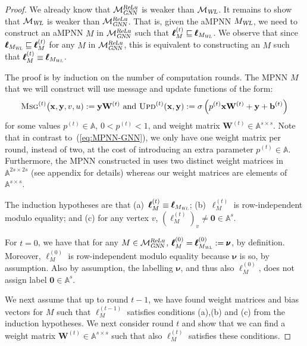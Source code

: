 \begin{proof}
We already know that $\mathcal{M}_{\textsl{GNN}}^{\textsl{ReLu}}$ is weaker than $\mathcal{M}_{\textsl{WL}}$. It remains to show that $\mathcal{M}_{\textsl{WL}}$ is weaker than $\mathcal{M}_{\textsl{GNN}}^{\textsl{ReLu}}$. That is, given the aMPNN $M_{\textsl{WL}}$, we need to construct an aMPNN $M$ in $\mathcal{M}_{\textsl{GNN}}^{\textsl{ReLu}}$ such that 
$\pmb{\ell}_{M}^{(t)}\sqsubseteq \pmb{\ell}_{M_{\textsl{WL}}}$. We observe that
since $\pmb{\ell}_{M_{\textsl{WL}}}\sqsubseteq \pmb{\ell}_{M}^{(t)}$ for any $M$ in $\mathcal{M}_{\textsl{GNN}}^{\textsl{ReLu}}$, this is equivalent to constructing an $M$ such that $\pmb{\ell}_{M}^{(t)}\equiv \pmb{\ell}_{M_{\textsl{WL}}}$. 

The proof is by induction on the number of computation rounds. The MPNN $M$ that we will construct will use message and update functions of the form:
\begin{equation}\textsc{Msg}^{(t)}\bigl(\mathbf{x},\mathbf{y},v,u):=\mathbf{y}\mathbf{W}^{(t)}
\text{ and } 
\textsc{Upd}^{(t)}(\mathbf{x},\mathbf{y}):=\sigma\left(p^{(t)}\mathbf{x}\mathbf{W}^{(t)}+\mathbf{y} + \mathbf{b}^{(t)}\right) \label{eq:MPNN-GNN-simple}
\end{equation}
for some values $p^{(t)}\in\mathbb{A}$, $0<p^{(t)}<1$, and weight matrix $\mathbf{W}^{(t)}\in\mathbb{A}^{s\times s}$. Note that in contrast to~(\ref{eq:MPNN-GNN}), we only have one weight matrix per round, instead of two, at the cost of introducing an extra parameter $p^{(t)}\in\mathbb{A}$.  Furthermore, the MPNN constructed in \cite{grohewl} uses two distinct weight matrices in $\mathbb{A}^{2s\times 2s}$ (see appendix for details) whereas our weight matrices are elements of $\mathbb{A}^{s\times s}$.

The induction hypotheses are that (a)~$\pmb{\ell}^{(t)}_M\equiv \pmb{\ell}_{M_{\textsl{WL}}}$; (b)~$\pmb{\ell}^{(t)}_M$ is row-independent modulo equality; and (c) for any vertex $v$, $(\pmb{\ell}^{(t)}_M)_v\neq\mathbf{0}\in\mathbb{A}^s$.

For $t=0$, we have that for any $M\in \mathcal{M}_{\textsl{GNN}}^{\textsl{ReLu}}$, $\pmb{\ell}_M^{(0)}=\pmb{\ell}_{M_{\textsl{WL}}}^{(0)}:=\pmb{\nu}$, by definition.
Moreover, $\pmb{\ell}_M^{(0)}$ is row-independent modulo equality because $\pmb{\nu}$ is so, by assumption. Also by assumption, the labelling $\pmb{\nu}$, and thus also 
$\pmb{\ell}_M^{(0)}$, does not assign label $\mathbf{0}\in\mathbb{A}^s$.

We next assume that up to round $t-1$, we have found weight matrices and bias vectors for $M$ such that 
$\pmb{\ell}_M^{(t-1)}$ satisfies conditions (a),(b) and (c) from the induction hypotheses. We next consider round $t$ and show that we can find a weight matrix $\mathbf{W}^{(t)}\in\mathbb{A}^{s\times s }$ such that also
$\pmb{\ell}_M^{(t)}$ satisfies these conditions.


\end{proof}
